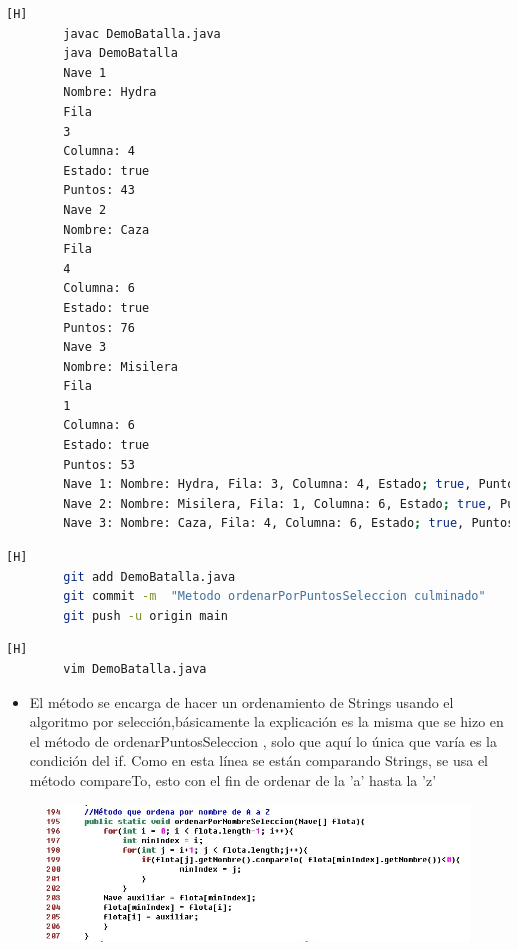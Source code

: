 \documentclass{article}
\begin{document}
	
	\begin{lstlisting}[language=bash,caption={Probando el metodo ordenarPorPuntosSeleccion}][H]	
		javac DemoBatalla.java
		java DemoBatalla
		Nave 1
		Nombre: Hydra
		Fila
		3
		Columna: 4
		Estado: true
		Puntos: 43
		Nave 2
		Nombre: Caza
		Fila
		4
		Columna: 6
		Estado: true
		Puntos: 76
		Nave 3
		Nombre: Misilera
		Fila
		1
		Columna: 6
		Estado: true
		Puntos: 53
		Nave 1: Nombre: Hydra, Fila: 3, Columna: 4, Estado; true, Puntos: 43
		Nave 2: Nombre: Misilera, Fila: 1, Columna: 6, Estado; true, Puntos: 53
		Nave 3: Nombre: Caza, Fila: 4, Columna: 6, Estado; true, Puntos: 76
	\end{lstlisting}
	\begin{lstlisting}[language=bash,caption={Commit: "Metodo ordenarPorPuntosSeleccion culminado" }][H]
		git add DemoBatalla.java
		git commit -m  "Metodo ordenarPorPuntosSeleccion culminado"		
		git push -u origin main
	\end{lstlisting}
	
	
	
	
	
	
	
	\begin{lstlisting}[language=bash,caption={Implementado el método ordenarPorNombreSeleccion }][H]
		vim DemoBatalla.java
	\end{lstlisting}
	
	
	\begin{itemize}	
		\item El método se encarga de hacer un ordenamiento de Strings usando el algoritmo por selección,básicamente la explicación es la misma que se hizo en el método de ordenarPuntosSeleccion , solo que aquí lo única que varía es la condición del if. Como en esta línea se están comparando Strings, se usa el método compareTo, esto con el fin de ordenar de la 'a' hasta la 'z'
	\end{itemize}	
	
	\begin{figure}[H]
		\centering
		\includegraphics[width=1\textwidth,keepaspectratio]{img/10.jpg}
	\end{figure}
	
\end{document}
